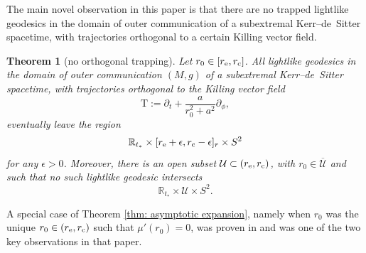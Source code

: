 \documentclass[pdftex]{sigma}
\newcommand{\e}{\epsilon}
\renewcommand{\d}{\partial}
\newcommand{\U}{\mathcal U}
\newcommand{\T}{\mathrm T}
\newcommand{\R}[0]{\mathbb{R}}
\numberwithin{equation}{section}
\newtheorem{Theorem}{Theorem}[section]
\begin{document}
The main novel observation in this paper is that there are no trapped lightlike geodesics in the domain of outer communication of a subextremal Kerr--de~Sitter spacetime, with trajectories orthogonal to a certain Killing vector field.


\begin{Theorem}[no orthogonal trapping] \label{thm: T-orth trapping}
Let $r_0 \in [r_{\rm e}, r_{\rm c}]$.
All lightlike geodesics in the domain of outer communication $(M,g)$ of a subextremal Kerr--de~Sitter spacetime, with trajectories orthogonal to the Killing vector field
\[
	\T
		:= \d_t + \frac{a}{r_0^2 + a^2} \d_\phi,
\]
eventually leave the region
\[
	\R_{t_*} \times [r_{\rm e}+\e, r_{\rm c}-\e]_r \times S^2
\]
for any $\e > 0$.
Moreover, there is an open subset $\U \subset (r_{\rm e}, r_{\rm c})$, with $r_0 \in \overline{\U}$ and such that no such lightlike geodesic intersects
\begin{equation} \label{eq: timelike region}
	\R_{t_*} \times \U \times S^2.
\end{equation}
\end{Theorem}

\begin{Remark}
A special case of Theorem \ref{thm: asymptotic expansion}, namely when $r_0$ was the unique $r_0 \in (r_{\rm e}, r_{\rm c})$ such that $\mu'(r_0) = 0$,
was proven in \cite[Lemma~2.4]{PV2023} and was one of the two key observations in that paper.
\end{Remark}
\end{document}
